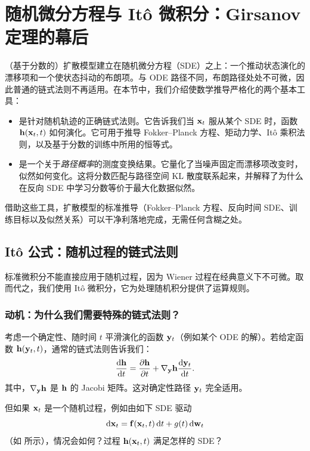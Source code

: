 \chapter{随机微分方程与 It\^o 微积分：Girsanov 定理的幕后}\label{app:Ito}


（基于分数的）扩散模型建立在随机微分方程（SDE）之上：一个推动状态演化的漂移项和一个使状态抖动的布朗项。与 ODE 路径不同，布朗路径处处不可微，因此普通的链式法则不再适用。在本节中，我们介绍使数学推导严格化的两个基本工具：
\begin{itemize}
\item {}是针对随机轨迹的正确链式法则。它告诉我们当 ${\mathbf{x}}_t$ 服从某个 SDE 时，函数 ${\mathbf{h}}({\mathbf{x}}_t,t)$ 如何演化。它可用于推导 Fokker–Planck 方程、矩动力学、It\^o 乘积法则，以及基于分数的训练中所用的恒等式。
\item {}是一个关于\emph{路径概率}的测度变换结果。它量化了当噪声固定而漂移项改变时，似然如何变化。这将分数匹配与路径空间 KL 散度联系起来，并解释了为什么在反向 SDE 中学习分数等价于最大化数据似然。
\end{itemize}

借助这些工具，扩散模型的标准推导（Fokker–Planck 方程、反向时间 SDE、训练目标以及似然关系）可以干净利落地完成，无需任何含糊之处。


\newpage


\section{It\^o 公式：随机过程的链式法则}
标准微积分不能直接应用于随机过程，因为 Wiener 过程在经典意义下不可微。取而代之，我们使用 It\^o 微积分，它为处理随机积分提供了运算规则。

\subsection{动机：为什么我们需要特殊的链式法则？}
考虑一个确定性、随时间 $t$ 平滑演化的函数 ${\mathbf{y}}_t$（例如某个 ODE 的解）。若给定函数 ${\mathbf{h}}({\mathbf{y}}_t, t)$，通常的链式法则告诉我们：
\[
\frac{\mathop{}\!\mathrm{d} {\mathbf{h}}}{\mathop{}\!\mathrm{d} t} = \frac{\partial {\mathbf{h}}}{\partial t}  + \nabla_{{\mathbf{y}}}{\mathbf{h}}  \frac{\mathop{}\!\mathrm{d} {\mathbf{y}}_t}{\mathop{}\!\mathrm{d} t} .
\]
其中，$\nabla_{{\mathbf{y}}}{\mathbf{h}}$ 是 ${\mathbf{h}}$ 的 Jacobi 矩阵。这对确定性路径 ${\mathbf{y}}_t$ 完全适用。

\begin{question}
    但如果 ${\mathbf{x}}_t$ 是一个随机过程，例如由如下 SDE 驱动
\[
\mathop{}\!\mathrm{d} {\mathbf{x}}_t = {\mathbf{f}}({\mathbf{x}}_t, t)\mathop{}\!\mathrm{d} t + g(t) \mathop{}\!\mathrm{d} {\mathbf{w}}_t
\]
（如  所示），情况会如何？过程 ${\mathbf{h}}({\mathbf{x}}_t, t)$ 满足怎样的 SDE？
\end{question}

